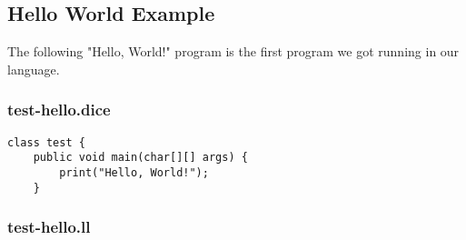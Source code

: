 \subsection{Hello World Example}
The following "Hello, World!" program is the first program we got running in our language.

\subsubsection{test-hello.dice}
\begin{verbatim}
class test {
	public void main(char[][] args) {
		print("Hello, World!");
	}
\end{verbatim}

\subsubsection{test-hello.ll}
